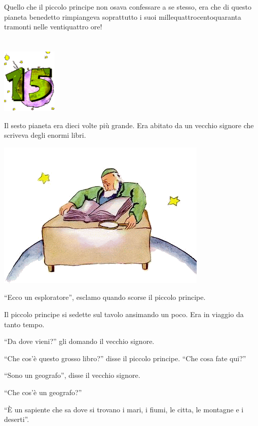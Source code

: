 \documentclass[11pt]{scrbook}
\begin{document}
Quello che il piccolo principe non osava confessare a se stesso, era che
di questo pianeta benedetto rimpiangeva soprattutto i suoi
millequattrocentoquaranta tramonti nelle ventiquattro ore!

\chapter{}
\begin{center}
\includegraphics{img/chapter15}
\end{center}

Il sesto pianeta era dieci volte più grande. Era abitato da un vecchio
signore che scriveva degli enormi libri.

\begin{center}
\includegraphics{img/15a}
\end{center}

``Ecco un esploratore'', esclamo quando scorse il piccolo principe.

Il piccolo principe si sedette sul tavolo ansimando un poco. Era in
viaggio da tanto tempo.

``Da dove vieni?'' gli domando il vecchio signore.

``Che cos'è questo grosso libro?'' disse il piccolo principe. ``Che cosa
fate qui?''

``Sono un geografo'', disse il vecchio signore.

``Che cos'è un geografo?''

``È un sapiente che sa dove si trovano i mari, i fiumi, le citta, le
montagne e i deserti''.
\end{document}
